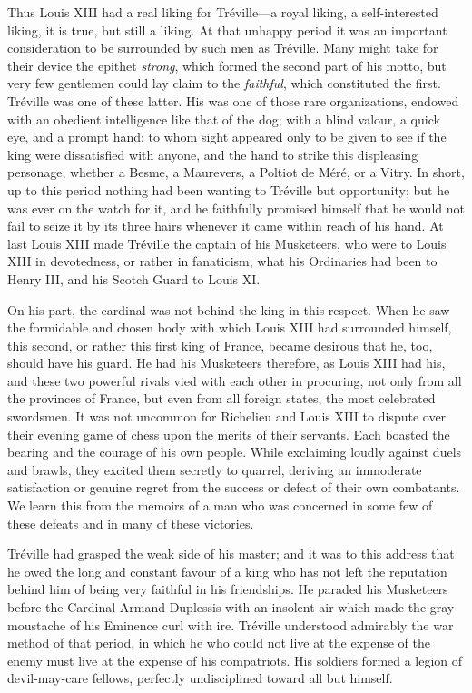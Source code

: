Thus Louis XIII had a real liking for Tréville---a royal liking, a self-interested liking, it is true, but still a liking. At that unhappy period it was an important consideration to be surrounded by such men as Tréville. Many might take for their device the epithet \textit{strong}, which formed the second part of his motto, but very few gentlemen could lay claim to the \textit{faithful}, which constituted the first. Tréville was one of these latter. His was one of those rare organizations, endowed with an obedient intelligence like that of the dog; with a blind valour, a quick eye, and a prompt hand; to whom sight appeared only to be given to see if the king were dissatisfied with anyone, and the hand to strike this displeasing personage, whether a Besme, a Maurevers, a Poltiot de Méré, or a Vitry. In short, up to this period nothing had been wanting to Tréville but opportunity; but he was ever on the watch for it, and he faithfully promised himself that he would not fail to seize it by its three hairs whenever it came within reach of his hand. At last Louis XIII made Tréville the captain of his Musketeers, who were to Louis XIII in devotedness, or rather in fanaticism, what his Ordinaries had been to Henry III, and his Scotch Guard to Louis XI. 

On his part, the cardinal was not behind the king in this respect. When he saw the formidable and chosen body with which Louis XIII had surrounded himself, this second, or rather this first king of France, became desirous that he, too, should have his guard. He had his Musketeers therefore, as Louis XIII had his, and these two powerful rivals vied with each other in procuring, not only from all the provinces of France, but even from all foreign states, the most celebrated swordsmen. It was not uncommon for Richelieu and Louis XIII to dispute over their evening game of chess upon the merits of their servants. Each boasted the bearing and the courage of his own people. While exclaiming loudly against duels and brawls, they excited them secretly to quarrel, deriving an immoderate satisfaction or genuine regret from the success or defeat of their own combatants. We learn this from the memoirs of a man who was concerned in some few of these defeats and in many of these victories. 

Tréville had grasped the weak side of his master; and it was to this address that he owed the long and constant favour of a king who has not left the reputation behind him of being very faithful in his friendships. He paraded his Musketeers before the Cardinal Armand Duplessis with an insolent air which made the gray moustache of his Eminence curl with ire. Tréville understood admirably the war method of that period, in which he who could not live at the expense of the enemy must live at the expense of his compatriots. His soldiers formed a legion of devil-may-care fellows, perfectly undisciplined toward all but himself. 

